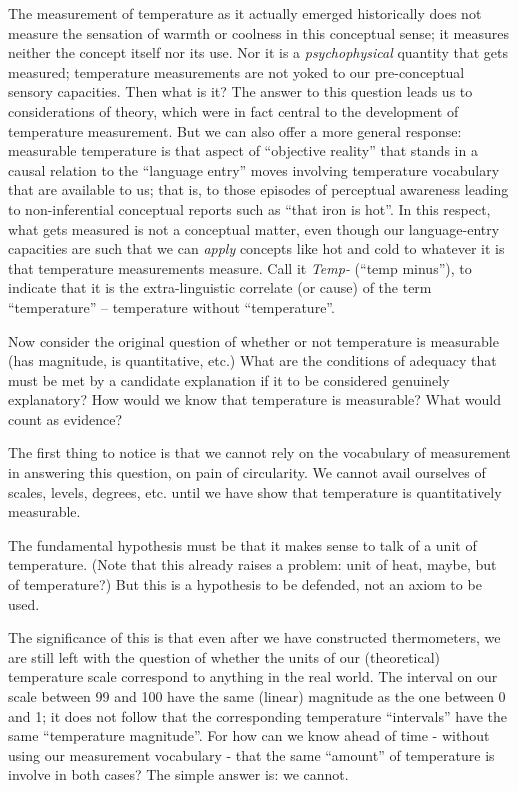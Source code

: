 \documentclass[11pt,twoside]{article}
\begin{document}
The measurement of temperature as it actually emerged historically
does not measure the sensation of warmth or coolness in this
conceptual sense; it measures neither the concept itself nor its use.
Nor it is a \textit{psychophysical} quantity that gets measured;
temperature measurements are not yoked to our pre-conceptual sensory
capacities.  Then what is it?  The answer to this question leads us to
considerations of theory, which were in fact central to the
development of temperature measurement.  But we can also offer a more
general response: measurable temperature is that aspect of ``objective
reality'' that stands in a causal relation to the ``language entry''
moves involving temperature vocabulary that are available to us; that
is, to those episodes of perceptual awareness leading to
non-inferential conceptual reports such as ``that iron is hot''.  In
this respect, what gets measured is not a conceptual matter, even
though our language-entry capacities are such that we can
\textit{apply} concepts like hot and cold to whatever it is that
temperature measurements measure.  Call it \textit{Temp-} (``temp
minus''), to indicate that it is the extra-linguistic correlate (or
cause) of the term ``temperature'' -- temperature without
``temperature''.


Now consider the original question of whether or not temperature is
measurable (has magnitude, is quantitative, etc.)  What are the
conditions of adequacy that must be met by a candidate explanation if
it to be considered genuinely explanatory?  How would we know that
temperature is measurable?  What would count as evidence?

The first thing to notice is that we cannot rely on the vocabulary of
measurement in answering this question, on pain of circularity.  We
cannot avail ourselves of scales, levels, degrees, etc. until we have
show that temperature is quantitatively measurable.

The fundamental hypothesis must be that it makes sense to talk of a
unit of temperature.  (Note that this already raises a problem: unit
of heat, maybe, but of temperature?)  But this is a hypothesis to be
defended, not an axiom to be used.

The significance of this is that even after we have constructed
thermometers, we are still left with the question of whether the units
of our (theoretical) temperature scale correspond to anything in the
real world.  The interval on our scale between 99 and 100 have the
same (linear) magnitude as the one between 0 and 1; it does not follow
that the corresponding temperature ``intervals'' have the same
``temperature magnitude''.  For how can we know ahead of time -
without using our measurement vocabulary - that the same ``amount'' of
temperature is involve in both cases?  The simple answer is: we cannot.
\end{document}
